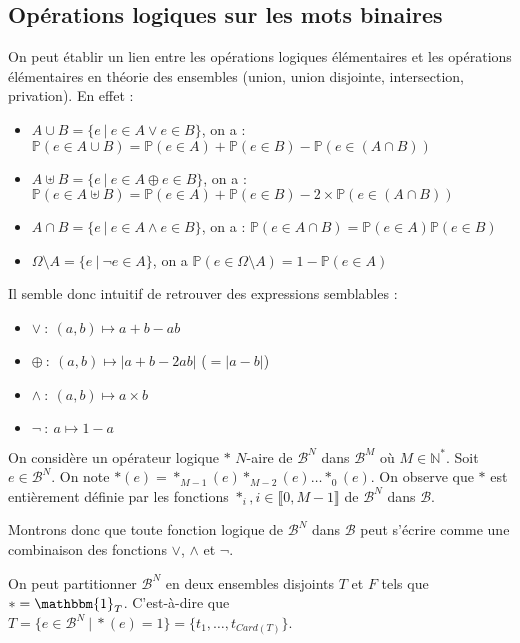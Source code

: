 \documentclass[../main.tex]{subfiles}
\begin{document}
\subsection{Opérations logiques sur les mots binaires}
 On peut établir un lien entre les opérations logiques élémentaires et les opérations élémentaires en théorie des ensembles (union, union disjointe, intersection, privation). En effet :
\begin{itemize}
	\item $A\cup{B} = \{e\ |\ e\in{A}\vee e\in{B}\}$, on a : $\mathbb{P}(e\in A\cup{B}) = \mathbb{P}(e\in A) + \mathbb{P}(e\in B) - \mathbb{P}(e\in (A\cap B))$
	\item $A\uplus{B} = \{e\ |\ e\in{A}\oplus e\in{B}\}$, on a : $\mathbb{P}(e\in A\uplus{B}) = \mathbb{P}(e\in A) + \mathbb{P}(e\in B) - 2\times\mathbb{P}(e\in (A\cap B))$
	\item $A\cap{B} = \{e\ |\ e\in{A}\wedge e\in{B}\}$, on a : $\mathbb{P}(e\in A\cap{B}) = \mathbb{P}(e\in A)\mathbb{P}(e\in B)$
	\item $\Omega\setminus{A} = \{e\ |\ \neg e\in{A}\}$, on a $\mathbb{P}(e\in{\Omega\setminus{A}}) = 1 - \mathbb{P}(e\in{A})$
\end{itemize}
Il semble donc intuitif de retrouver des expressions semblables :
\begin{itemize}
	\item $\vee\ :\ (a, b) \mapsto a + b - ab$
	\item $\oplus\ :\ (a, b) \mapsto |a + b - 2ab|$ ($= |a - b|$)
	\item $\wedge\ :\ (a, b) \mapsto a\times b$
	\item $\neg\ :\ a \mapsto 1 - a$
\end{itemize}
On considère un opérateur logique $\ast$ $N$-aire de $\mathcal{B}^{N}$ dans $\mathcal{B}^{M}$ où $M\in{\mathbb{N}^{*}}$. Soit $e\in{\mathcal{B}^{N}}$. On note $\ast(e) = \ast_{M-1}(e)\ast_{M-2}(e)\dots\ast_{0}(e)$. On observe que $\ast$ est entièrement définie par les fonctions $\ast_{i}, i\in{\llbracket0, M-1\rrbracket}$ de $\mathcal{B}^{N}$ dans $\mathcal{B}$.

Montrons donc que toute fonction logique de $\mathcal{B}^{N}$ dans $\mathcal{B}$ peut s'écrire comme une combinaison des fonctions $\vee$, $\wedge$ et $\neg$.

On peut partitionner $\mathcal{B}^{N}$ en deux ensembles disjoints $T$ et $F$ tels que $\ast = \mathbbm{1}_{T}$. C'est-à-dire que $T = \{e\in\mathcal{B}^{N}\ |\ \ast(e) = 1\} = \{t_{1}, \dots, t_{Card(T)}\}$.
\end{document}
